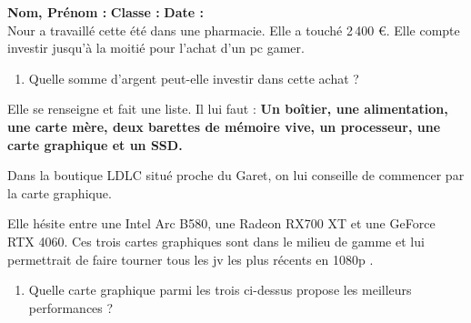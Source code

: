 



\textbf{Nom, Prénom :} \hspace{8cm} \textbf{Classe :} \hspace{3cm} \textbf{Date :}\\

Nour a travaillé cette été dans une pharmacie. Elle a touché 2\,400 \euro{}. Elle compte investir jusqu'à la moitié pour l'achat d'un pc gamer. 

\begin{enumerate}
  \item[1.] Quelle somme d'argent peut-elle investir dans cette achat ?
\end{enumerate}
\Pointilles[2]

\begin{multicols}{2}
Elle se renseigne et fait une liste. Il lui faut : \textbf{Un boîtier, une alimentation, une carte mère, deux barettes de mémoire vive, un processeur, une carte graphique et un SSD.}


Dans la boutique LDLC situé proche du Garet, on lui conseille de commencer par la carte graphique. 

Elle hésite entre une Intel Arc B580, une Radeon RX700 XT et une GeForce RTX 4060. Ces trois cartes graphiques sont dans le milieu de gamme et lui permettrait de faire tourner \og tous les jv les plus récents en 1080p \fg{}. 

\begin{enumerate}
  \item[2.] Quelle carte graphique parmi les trois ci-dessus propose les meilleurs performances ?
\end{enumerate}

\Pointilles[4] \columnbreak


\end{multicols}
